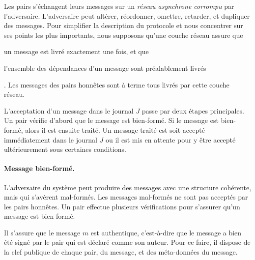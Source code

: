 


Les pairs s'échangent leurs messages sur un \emph{réseau asynchrone corrompu} par l'adversaire.
L'adversaire peut altérer, réordonner, omettre, retarder, et dupliquer des messages.
Pour simplifier la description du protocole et nous concentrer sur ses points les plus importants, nous supposons qu'une couche réseau assure que \begin{inlinelist}\item un message est livré exactement une fois, et que \item l'ensemble des dépendances d'un message sont préalablement livrés\end{inlinelist}.
Les messages des pairs honnêtes sont à terme tous livrés par cette couche réseau.

L'acceptation d'un message dans le journal $J$ passe par deux étapes principales.
Un pair vérifie d'abord que le message est bien-formé.
Si le message est bien-formé, alors il est ensuite traité.
Un message traité est soit accepté immédiatement dans le journal $J$ ou il est mis en attente pour y être accepté ultérieurement sous certaines conditions.

\paragraph{Message bien-formé.} L'adversaire du système peut produire des messages avec une structure cohérente, mais qui s'avèrent mal-formés.
Les messages mal-formés ne sont pas acceptés par les pairs honnêtes.
Un pair effectue plusieurs vérifications pour s'assurer qu'un message est bien-formé.


Il s'assure que le message $m$ est authentique, c'est-à-dire que le message a bien été signé par le pair qui est déclaré comme son auteur.
Pour ce faire, il dispose de la clef publique de chaque pair, du message, et des méta-données du message.


